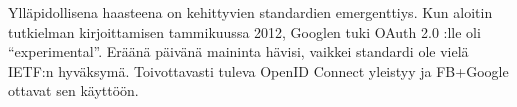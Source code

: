 \documentclass[finnish,gradu]{tktltiki}
\begin{document}
  Ylläpidollisena haasteena on kehittyvien standardien emergenttiys. Kun aloitin tutkielman kirjoittamisen tammikuussa 2012, Googlen tuki OAuth 2.0 :lle oli ``experimental''. Eräänä päivänä maininta hävisi, vaikkei standardi ole vielä IETF:n hyväksymä. %
Toivottavasti tuleva OpenID Connect yleistyy ja FB+Google ottavat sen käyttöön.











\newpage




\lastpage
\end{document}

